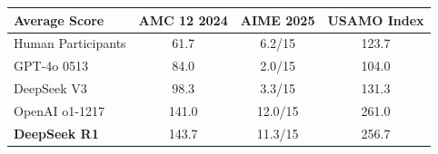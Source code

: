\begin{table}[h]
    \centering
    \label{tab:math_2025_eval}
    \begin{tabular}{l|cc|c} \toprule
    Average Score & \textbf{AMC 12 2024} & \textbf{AIME 2025} & \textbf{USAMO Index}  \\    \midrule
    Human Participants & 61.7 & 6.2/15 & 123.7 \\
    \midrule
    GPT-4o 0513 & 84.0 & 2.0/15 & 104.0 \\
    DeepSeek V3 & 98.3 & 3.3/15 & 131.3 \\
    \midrule
    OpenAI o1-1217 & 141.0 & 12.0/15 & 261.0 \\
    \textbf{DeepSeek R1} & 143.7 & 11.3/15 & 256.7 \\
    \bottomrule
    \end{tabular}
\end{table}
